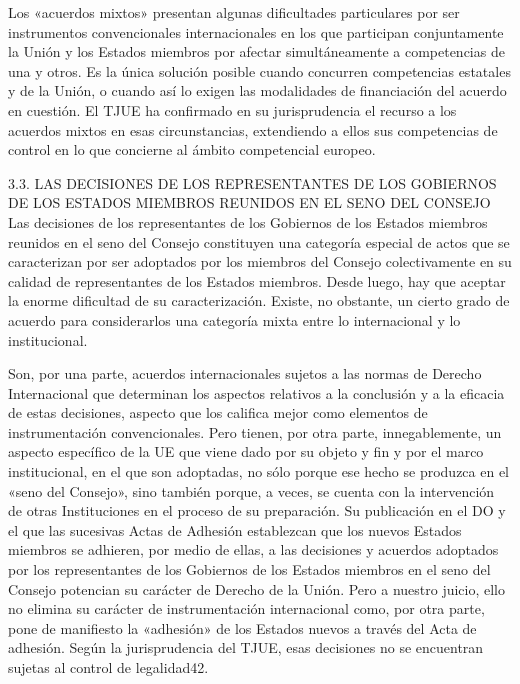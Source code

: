 \documentclass[10pt,a4paper]{article}
\begin{document}
Los «acuerdos mixtos» presentan algunas dificultades particulares por ser instrumentos convencionales internacionales en los que participan conjuntamente la Unión y los Estados miembros por afectar simultáneamente a competencias de una y otros. Es la única solución posible cuando concurren competencias estatales y de la Unión, o cuando así lo exigen las modalidades de financiación del acuerdo en cuestión. El TJUE ha confirmado en su jurisprudencia el recurso a los acuerdos mixtos en esas circunstancias, extendiendo a ellos sus competencias de control en  lo que concierne al ámbito competencial europeo.

3.3. LAS DECISIONES DE LOS REPRESENTANTES DE LOS GOBIERNOS DE
LOS ESTADOS MIEMBROS REUNIDOS EN EL SENO DEL CONSEJO 
Las decisiones de los representantes de los Gobiernos de los Estados miembros reunidos en el seno del Consejo constituyen una categoría especial de actos que se caracterizan por ser adoptados por los miembros del Consejo colectivamente en su calidad de representantes de los Estados miembros. Desde luego, hay que aceptar la enorme dificultad de su caracterización. Existe, no obstante, un cierto grado de acuerdo para considerarlos una categoría mixta entre lo internacional y lo institucional. 

Son, por una parte, acuerdos internacionales sujetos a las normas de Derecho Internacional que determinan los aspectos relativos a la conclusión y a la eficacia de estas decisiones, aspecto que los califica mejor como elementos de instrumentación convencionales. Pero tienen, por otra parte, innegablemente, un aspecto específico de la UE que viene dado por su objeto y fin y por el marco institucional, en el que son adoptadas, no sólo porque ese hecho se produzca en el «seno del Consejo», sino también porque, a veces, se cuenta con la intervención de otras Instituciones en el proceso de su preparación. Su publicación en el DO y el que las sucesivas Actas de Adhesión establezcan que los nuevos Estados miembros se adhieren, por medio de ellas, a las decisiones y  acuerdos adoptados por los representantes de los Gobiernos de los Estados miembros en el seno del Consejo potencian su carácter de Derecho de la Unión. Pero a nuestro juicio, ello no elimina su carácter de instrumentación internacional como, por otra parte, pone de manifiesto la «adhesión» de los Estados nuevos a través del Acta de adhesión. Según la jurisprudencia del TJUE, esas decisiones no se encuentran sujetas al control de legalidad42.
\end{document}
